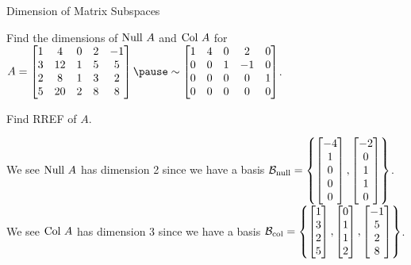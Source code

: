 \documentclass[xcolor=dvipsnames,aspectratio=169,t]{beamer}
\begin{document}
\begin{frame}{Dimension of Matrix Subspaces}

Find the dimensions of $\mbox{Null } A$ and $\mbox{Col } A$ for 
$\dsty A = \begin{bmatrix} 1 & 4 & 0 & 2 & -1\\ 
3 & 12 & 1 & 5 & 5 \\ 
2 & 8 & 1 & 3 & 2 \\ 
5 & 20 & 2 & 8 & 8 
\end{bmatrix}
\pause
\sim 
\begin{bmatrix} 1 & 4 & 0 & 2 & 0 \\ 0 & 0 & 1 & -1 & 0 \\ 0 & 0 & 0 & 0 & 1 \\ 0 & 0 & 0 & 0 & 0 \end{bmatrix}$.

Find RREF of $A$.



\bi
\ii We see $\mbox{Null } A$ has dimension 2 since we have a basis $\mathcal{B}_{\rm null} = \left\{  \begin{bmatrix} -4 \\ 1 \\ 0 \\ 0 \\ 0 \end{bmatrix} , \begin{bmatrix} -2 \\ 0 \\ 1 \\ 1 \\ 0 \end{bmatrix} \right\}$.
\ii We see $\mbox{Col } A$ has dimension 3 since we have a basis $\mathcal{B}_{\rm col} = \left\{ \begin{bmatrix} 1 \\ 3 \\ 2 \\ 5 \end{bmatrix} , \begin{bmatrix} 0 \\ 1 \\ 1 \\ 2 \end{bmatrix}  ,  \begin{bmatrix} -1 \\ 5 \\ 2 \\ 8 \end{bmatrix} \right\}$.
\ei

\end{frame}
\end{document}

